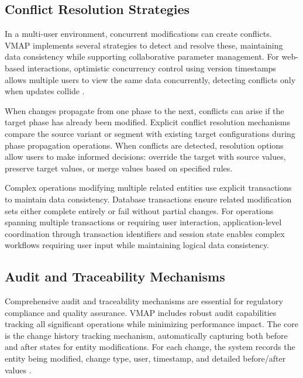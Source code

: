 \subsection{Conflict Resolution Strategies}
\label{subsec:conflict-resolution-strategies}

In a multi-user environment, concurrent modifications can create conflicts. VMAP implements several strategies to detect and resolve these, maintaining data consistency while supporting collaborative parameter management. For web-based interactions, optimistic concurrency control using version timestamps allows multiple users to view the same data concurrently, detecting conflicts only when updates collide \cite{bhattacherjee2015principles}.

When changes propagate from one phase to the next, conflicts can arise if the target phase has already been modified. Explicit conflict resolution mechanisms compare the source variant or segment with existing target configurations during phase propagation operations. When conflicts are detected, resolution options allow users to make informed decisions: override the target with source values, preserve target values, or merge values based on specified rules.

Complex operations modifying multiple related entities use explicit transactions to maintain data consistency. Database transactions ensure related modification sets either complete entirely or fail without partial changes. For operations spanning multiple transactions or requiring user interaction, application-level coordination through transaction identifiers and session state enables complex workflows requiring user input while maintaining logical data consistency.

\subsection{Audit and Traceability Mechanisms}
\label{subsec:audit-mechanisms}

Comprehensive audit and traceability mechanisms are essential for regulatory compliance and quality assurance. VMAP includes robust audit capabilities tracking all significant operations while minimizing performance impact. The core is the change history tracking mechanism, automatically capturing both before and after states for entity modifications. For each change, the system records the entity being modified, change type, user, timestamp, and detailed before/after values \cite{bhattacherjee2015principles}.

